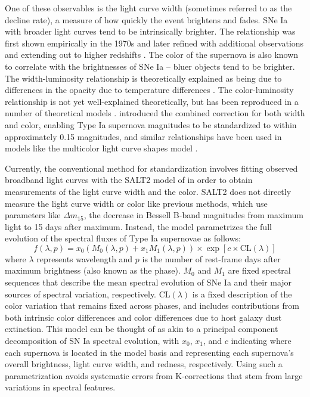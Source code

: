 One of these observables is the light curve width (sometimes referred to as the decline rate), a measure of how quickly the event brightens and fades. SNe Ia with broader light curves tend to be intrinsically brighter. The relationship was first shown empirically in the 1970s \citep{rust_use_1974, pskovskii_light_1977} and later refined with additional observations and extending out to higher redshifts \citep{phillips_absolute_1993, hamuy_morphology_1996, perlmutter_measurements_1997}. The color of the supernova is also known to correlate with the brightnesses of SNe Ia -- bluer objects tend to be brighter. The width-luminosity relationship is theoretically explained as being due to differences in the opacity due to temperature differences \citep{kasen_origin_2007}. The color-luminosity relationship is not yet well-explained theoretically, but has been reproduced in a number of theoretical models \citep[e.g.][]{kasen_diversity_2009}. \citet{tripp_two-parameter_1998} introduced the combined correction for both width and color, enabling Type Ia supernova magnitudes to be standardized to within approximately 0.15 magnitudes, and similar relationships have been used in models like the multicolor light curve shapes model \citep[MLCS,][]{riess_precise_1996}.

Currently, the conventional method for standardization involves fitting observed broadband light curves with the SALT2 model of \citet{guy_salt2_2007} in order to obtain measurements of the light curve width and the color. SALT2 does not directly measure the light curve width or color like previous methods, which use parameters like $\Delta m_{15}$, the decrease in Bessell B-band magnitudes from maximum light to 15 days after maximum. Instead, the model parametrizes the full evolution of the spectral fluxes of Type Ia supernovae as follows:
\begin{equation}
    f(\lambda, p) = x_0\left(M_0(\lambda, p) + x_1 M_1(\lambda, p)\right) \times \exp [c\times\textrm{CL}(\lambda)]
    \label{eqn:salt_flux}
\end{equation}
where $\lambda$ represents wavelength and $p$ is the number of rest-frame days after maximum brightness (also known as the phase). $M_0$ and $M_1$ are fixed spectral sequences that describe the mean spectral evolution of SNe Ia and their major sources of spectral variation, respectively. $\textrm{CL}(\lambda)$ is a fixed description of the color variation that remains fixed across phases, and includes contributions from both intrinsic color differences and color differences due to host galaxy dust extinction. This model can be thought of as akin to a principal component decomposition of SN Ia spectral evolution, with $x_0$, $x_1$, and $c$ indicating where each supernova is located in the model basis and representing each supernova's overall brightness, light curve width, and redness, respectively. Using such a parametrization avoids systematic errors from K-corrections that stem from large variations in spectral features.

